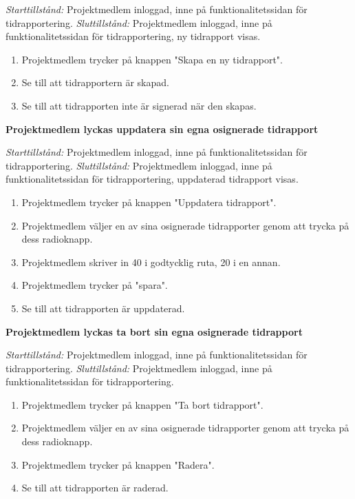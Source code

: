\documentclass[a4paper]{article}
\begin{document}
\begin{FT}
\emph{Starttillstånd:} Projektmedlem inloggad, inne på funktionalitetssidan för tidrapportering.
\emph{Sluttillstånd:} Projektmedlem inloggad, inne på funktionalitetssidan för tidrapportering, ny tidrapport visas.

\begin{enumerate}
\item Projektmedlem trycker på knappen "Skapa en ny tidrapport".
\item Se till att tidrapportern är skapad.
\item Se till att tidrapporten inte är signerad när den skapas.
\end{enumerate}

\item
\textbf{Projektmedlem lyckas uppdatera sin egna osignerade tidrapport}

\emph{Starttillstånd:} Projektmedlem inloggad, inne på funktionalitetssidan för tidrapportering.
\emph{Sluttillstånd:} Projektmedlem inloggad, inne på funktionalitetssidan för tidrapportering, uppdaterad tidrapport visas.

\begin{enumerate}
\item Projektmedlem trycker på knappen "Uppdatera tidrapport".
\item Projektmedlem väljer en av sina osignerade tidrapporter genom att trycka på dess radioknapp.
\item Projektmedlem skriver in 40 i godtycklig ruta, 20 i en annan.
\item Projektmedlem trycker på "spara".
\item Se till att tidrapporten är uppdaterad.
\end{enumerate}

\item
\textbf{Projektmedlem lyckas ta bort sin egna osignerade tidrapport}

\emph{Starttillstånd:} Projektmedlem inloggad, inne på funktionalitetssidan för tidrapportering.
\emph{Sluttillstånd:} Projektmedlem inloggad, inne på funktionalitetssidan för tidrapportering.

\begin{enumerate}
\item Projektmedlem trycker på knappen "Ta bort tidrapport".
\item Projektmedlem väljer en av sina osignerade tidrapporter genom att trycka på dess radioknapp.
\item Projektmedlem trycker på knappen "Radera".
\item Se till att tidrapporten är raderad.
\end{enumerate}


\end{FT}
\end{document}
